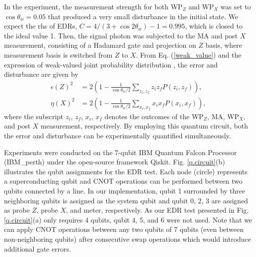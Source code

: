 \documentclass[%
reprint,
superscriptaddress,
 amsmath,amssymb,
 aps,
pra,
]{revtex4-2}
\begin{document}
In the experiment, the measurement strength for both WP$_Z$ and WP$_X$ was set to $\cos \theta_{w} = 0.05$ that produced a very small disturbance in the initial state. We expect the rhs of EDRs, $C = 4/ (3+\cos2\theta_w)-1=0.995$, which is closed to the ideal value 1.
Then, the signal photon was subjected to the MA and post $X$ measurement, consisting of a Hadamard gate and projection on $Z$ basis, where measurement basis is switched from $Z$ to $X$.
From Eq. (\ref{weak_value}) and the expression of weak-valued joint probability distribution \cite{Lund_2010}, the error and disturbance are given by
\begin{equation}
    \label{err_disturbance2}
    \begin{aligned}
        \epsilon(Z)^2 &= 2\left( 1- \frac{1}{\cos\theta_w/2}\sum_{z_i,z_f}z_i z_f P(z_i, z_f)\right),\\
        \eta(X)^2 &= 2\left(1- \frac{1}{\cos\theta_w/2}\sum_{x_i,x_f}x_i x_f P(x_i, x_f)\right), 
    \end{aligned}
\end{equation}
where the subscript $z_i$, $z_f$, $x_i$, $x_f$ denotes the outcomes of the WP$_Z$, MA, WP$_X$, and post $X$ measurement, respectively. 
By employing this quantum circuit, both the error and disturbance can be experimentally quantified simultaneously.

Experiments were conducted on the 7-qubit IBM Quantum Falcon Processor (IBM\_perth) \cite{ibm2021} under the open-source framework Qiskit. Fig. \ref{q.circuit}(b) illustrates the qubit assignments for the EDR test.
Each node (circle) represents a superconducting qubit and CNOT operations can be performed between two qubits connected by a line. 
In our implementation, qubit 1 surrounded by three neighboring qubits is assigned as the system qubit and qubit 0, 2, 3 are assigned as probe $Z$, probe $X$, and meter, respectively.
As our EDR test presented in Fig. \ref{q.circuit}(a) only requires 4 qubits, qubit 4, 5, and 6 were not used. 
Note that we can apply CNOT operations between any two qubits of 7 qubits (even between non-neighboring qubits) after consecutive swap operations which would introduce additional gate errors.
\end{document}
